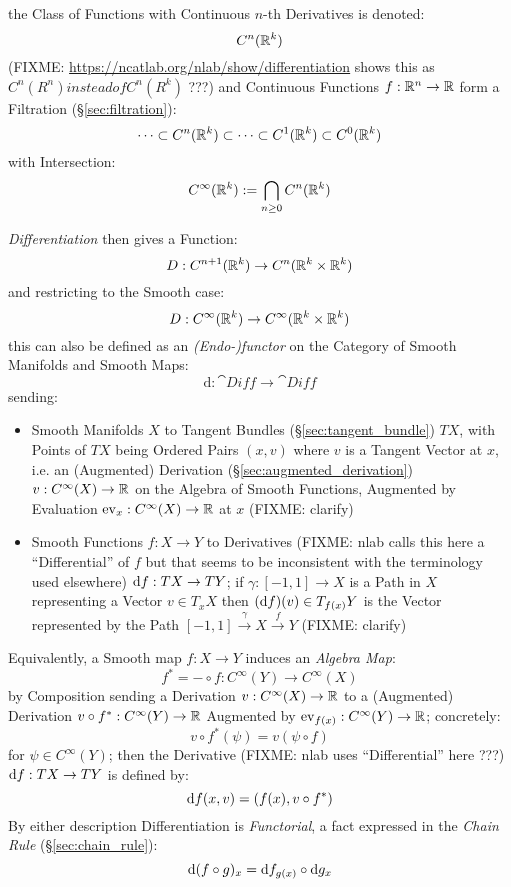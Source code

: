 the Class of Functions with Continuous $n$-th Derivatives is denoted:
\[
  C^n(\mathbb{R}^k)
\]
(FIXME: \url{https://ncatlab.org/nlab/show/differentiation} shows this as
$C^n(R^n) instead of C^n(R^k)$ ???)
and Continuous Functions $f : \mathbb{R}^n \rightarrow \mathbb{R}$ form a Filtration
(\S\ref{sec:filtration}):
\[
  \cdots \subset C^n(\mathbb{R}^k) \subset \cdots \subset C^1(\mathbb{R}^k) \subset
    C^0(\mathbb{R}^k)
\]
with Intersection:
\[
  C^\infty(\mathbb{R}^k) := \bigcap_{n\geq{0}} C^n(\mathbb{R}^k)
\]

\emph{Differentiation} then gives a Function:
\[
  D : C^{n+1}(\mathbb{R}^k) \rightarrow C^n(\mathbb{R}^k \times \mathbb{R}^k)
\]
and restricting to the Smooth case:
\[
  D : C^\infty(\mathbb{R}^k) \rightarrow C^\infty(\mathbb{R}^k \times \mathbb{R}^k)
\]
this can also be defined as an \emph{(Endo-)functor} on the Category of Smooth
Manifolds and Smooth Maps:
\[
  \mathrm{d} : \cat{Diff} \rightarrow \cat{Diff}
\]
sending:
\begin{itemize}
  \item Smooth Manifolds $X$ to Tangent Bundles (\S\ref{sec:tangent_bundle}) $T
    X$, with Points of $T X$ being Ordered Pairs $(x, v)$ where $v$ is a Tangent
    Vector at $x$, i.e. an (Augmented) Derivation
    (\S\ref{sec:augmented_derivation}) $v : C^\infty(X) \rightarrow \mathbb{R}$ on
    the Algebra of Smooth Functions, Augmented by Evaluation $\mathrm{ev}_x :
    C^\infty(X) \rightarrow \mathbb{R}$ at $x$ (FIXME: clarify)
  \item Smooth Functions $f : X \rightarrow Y$ to Derivatives (FIXME: nlab calls
    this here a ``Differential'' of $f$ but that seems to be inconsistent with
    the terminology used elsewhere) $\mathrm{d}f : TX \rightarrow TY$; if $\gamma
    : [-1,1] \rightarrow X$ is a Path in $X$ representing a Vector
    $v \in T_x{X}$ then $(\mathrm{d}f)(v) \in T_{f(x)}Y$ is the Vector represented
    by the Path $[-1, 1] \xrightarrow{\gamma} X \xrightarrow{f} Y$
    (FIXME: clarify)
\end{itemize}
Equivalently, a Smooth map $f : X \rightarrow Y$ induces an \emph{Algebra Map}:
\[
  f^* = - \circ f : C^\infty(Y) \rightarrow C^\infty(X)
\]
by Composition sending a Derivation $v : C^\infty(X) \rightarrow \mathbb{R}$ to a
(Augmented) Derivation $v \circ f^* : C^\infty(Y) \rightarrow \mathbb{R}$ Augmented
by $\mathrm{ev}_{f(x)} : C^\infty(Y) \rightarrow \mathbb{R}$; concretely:
\[
  v \circ f^*(\psi) = v(\psi \circ f)
\]
for $\psi \in C^\infty(Y)$; then the Derivative (FIXME: nlab uses
``Differential'' here ???) $\mathrm{d}f : T X \rightarrow T Y$ is defined by:
\[
  \mathrm{d}f(x,v) = (f(x), v \circ f^*)
\]
By either description Differentiation is \emph{Functorial}, a fact expressed in
the \emph{Chain Rule} (\S\ref{sec:chain_rule}):
\[
  \mathrm{d}(f \circ g)_x = \mathrm{d}f_{g(x)} \circ \mathrm{d}g_x
\]

